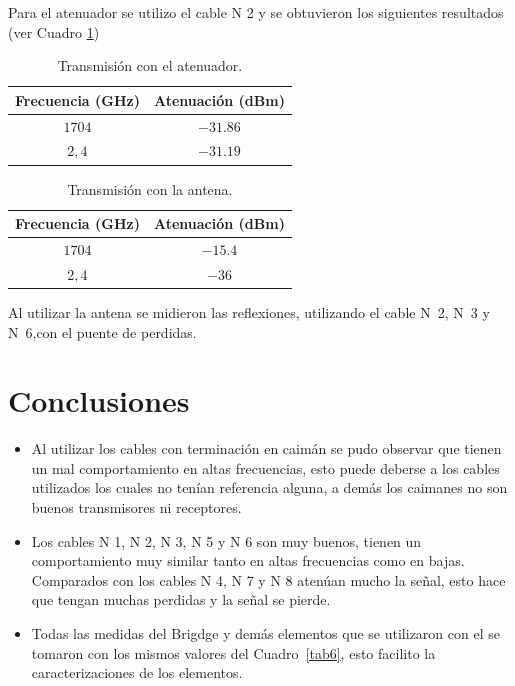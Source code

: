 \documentclass[12pt,graphicx,caption,rotating]{article}
\begin{document}
\noindent
Para el atenuador se utilizo el cable N 2 y se obtuvieron los siguientes resultados (ver Cuadro \ref{tab11})
\begin{table}[H]
  \centering
  \caption{Transmisión con el atenuador.}
    \begin{tabular}{|c|c|}\hline
      \textbf{Frecuencia (GHz) } & \textbf{Atenuación (dBm) } \\ \hline
      $1704$ & $−31.86$ \\ \hline
      $2,4 $ & $−31.19$ \\ \hline
    \end{tabular}
  \label{tab11}
\end{table}

\begin{table}[H]
  \centering
  \caption{Transmisión con la antena.}
    \begin{tabular}{|c|c|}\hline
      \textbf{Frecuencia (GHz) } & \textbf{Atenuación (dBm) } \\ \hline
      $1704$ & $−15.4$ \\ \hline
      $2,4 $ & $−36$ \\ \hline
    \end{tabular}
  \label{tab12}
\end{table}
\noindent
Al utilizar la antena se midieron las reflexiones, utilizando el cable N~2, N~3 y N~6,con el puente de perdidas.

\section{Conclusiones}

\begin{itemize}
 \item Al utilizar los cables con terminación en caimán se pudo observar que tienen un mal comportamiento en altas frecuencias, esto puede deberse a los cables utilizados los cuales no tenían referencia alguna, a demás los caimanes no son buenos transmisores ni receptores.
 \item Los cables N 1, N 2, N 3, N 5 y N 6 son muy buenos, tienen un comportamiento muy similar tanto en altas frecuencias como en bajas. Comparados con los cables N 4, N 7 y N 8 atenúan mucho la señal, esto hace que tengan muchas perdidas y la señal se pierde.
 \item Todas las medidas del Brigdge y demás elementos que se utilizaron con el se tomaron con los mismos valores del Cuadro~\ref{tab6}, esto facilito la caracterizaciones de los elementos.
\end{itemize}
\end{document}
